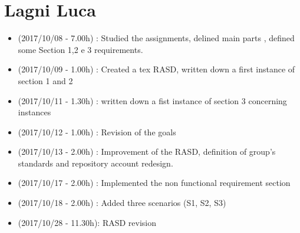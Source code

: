 \documentclass[a4paper,leqno]{book}
\begin{document}
\section{Lagni Luca}
\begin{itemize}
\item (2017/10/08 - 7.00h) : Studied the assignments, delined main parts , defined some Section 1,2 e 3 requirements.
\item (2017/10/09 - 1.00h) : Created a tex RASD, written down a first instance of section 1 and 2
\item (2017/10/11 - 1.30h) : written down a fist instance of section 3 concerning instances
\item (2017/10/12 - 1.00h) : Revision of the goals 
\item (2017/10/13 - 2.00h) : Improvement of the RASD, definition of group's standards and repository account redesign.
\item (2017/10/17 - 2.00h) : Implemented the non functional requirement section
\item (2017/10/18 - 2.00h) : Added three scenarios (S1, S2, S3)
\item (2017/10/28 - 11.30h): RASD revision
\end{itemize}
\end{document}
